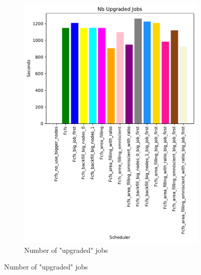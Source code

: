 \documentclass[a4paper]{article}
\begin{document}
\begin{figure}[H]\centering
\begin{subfigure}[b]{0.4\linewidth}\centering\includegraphics[width=1\linewidth]{MBSS/plot/Size_Constraint_2022-01-24->2022-01-24_Nb_Upgraded_Jobs_162_128_162_256_162_1024.pdf}\caption{Number of "upgraded" jobs}\label{15}\end{subfigure}

\end{figure}
\end{document}
